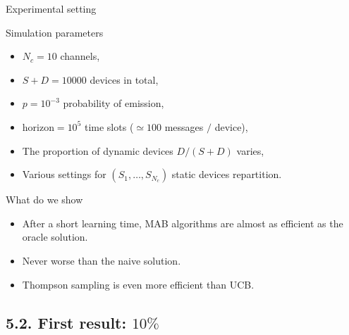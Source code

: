 \documentclass[12pt,english,ignorenonframetext,aspectratio=169,]{beamer}
\providecommand{\tightlist}{%
  \setlength{\itemsep}{0pt}\setlength{\parskip}{0pt}}
\begin{document}
\begin{frame}{Experimental setting}

\begin{block}{Simulation parameters}

\begin{itemize}
\tightlist
\item
  \(N_c = 10\) channels,
\item
  \(S + D = 10000\) devices in total,
\item
  \(p = 10^{-3}\) probability of emission,
\item
  \(\text{horizon} = 10^5\) time slots (\(\simeq 100\) messages \(/\)
  device),
\item
  The proportion of dynamic devices \(D/(S+D)\) varies,
\item
  Various settings for \((S_1,\dots,S_{N_c})\) static devices
  repartition.
\end{itemize}

\end{block}

\begin{block}{What do we show}

\begin{itemize}
\tightlist
\item
  After a short learning time, MAB algorithms are almost as efficient as
  the oracle solution.
\item
  Never worse than the naive solution.
\item
  Thompson sampling is even more efficient than UCB.
\end{itemize}

\end{block}

\end{frame}



\subsection{\hfill{}5.2. First result: $10\%$\hfill{}}
\end{document}
